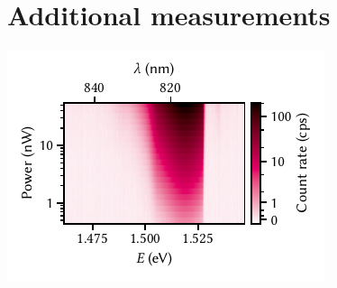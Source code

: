 \chapter{Additional measurements}\label{ch:app:exp:observations}

\begin{marginfigure}
    \centering
    \includegraphics{img/pdf/experiment/2deg_pl_power_dependence}
    \caption[
        .
        \protect\newline
    ]{}
    \label{fig:app:exp:observations:2deg_pl_power_dependence}
\end{marginfigure}
